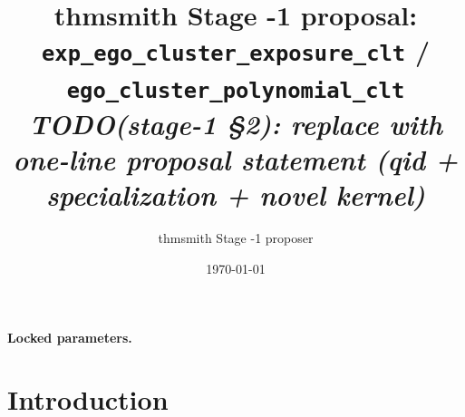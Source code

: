 \documentclass[11pt]{article}
\title{thmsmith Stage -1 proposal: \texttt{exp\_ego\_cluster\_exposure\_clt} / \texttt{ego\_cluster\_polynomial\_clt}%
  \\ \large\textit{TODO(stage-1 \S2): replace with one-line proposal statement (qid + specialization + novel kernel)}}
\author{thmsmith Stage -1 proposer}
\date{\today}
\theoremstyle{definition}
\theoremstyle{plain}
\theoremstyle{remark}
\begin{document}
\maketitle


\paragraph{Locked parameters.}

\begin{abstract}
\end{abstract}

\section{Introduction}
%
%
%
%
\end{document}
